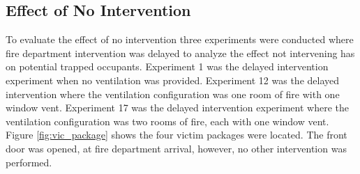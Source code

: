 \documentclass[12pt,oneside]{book}
\begin{document}



\clearpage

\subsection{Effect of No Intervention}


To evaluate the effect of no intervention three experiments were conducted where fire department intervention was delayed to analyze the effect not intervening has on potential trapped occupants. Experiment 1 was the delayed intervention experiment when no ventilation was provided. Experiment 12 was the delayed intervention where the ventilation configuration was one room of fire with one window vent. Experiment 17 was the delayed intervention experiment where the ventilation configuration was two rooms of fire, each with one window vent. Figure \ref{fig:vic_package} shows the four victim packages were located. The front door was opened, at fire department arrival, however, no other intervention was performed. 
\end{document}
